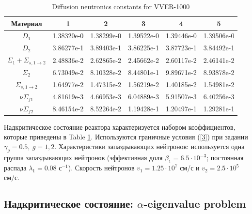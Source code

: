 \documentclass[authoryear]{elsarticle}
\begin{document}
\begin{table}[htr]
\caption{Diffusion neutronics constants for VVER-1000}
\label{t-1}
\begin{center}
\begin{tabular}{|c|c|c|c|c|c|}
\hline
Материал & 1 & 2 & 3 & 4 & 5\\
\hline
$D_1$ & 1.38320e-0 & 1.38299e-0  & 1.39522e-0  & 1.39446e-0  & 1.39506e-0 \\
$D_2$ & 3.86277e-1 & 3.89403e-1 & 3.86225e-1 & 3.87723e-1 & 3.84492e-1 \\
$\Sigma_1 + \Sigma_{s,1\rightarrow 2}$ & 2.48836e-2 & 2.62865e-2 & 2.45662e-2 & 2.60117e-2 & 2.46141e-2\\
$\Sigma_2$ & 6.73049e-2 & 8.10328e-2 & 8.44801e-1 & 9.89671e-2 & 8.93878e-2\\
$\Sigma_{s,1\rightarrow 2}$ & 1.64977e-2 & 1.47315e-2 & 1.56219e-2 & 1.40185e-2 & 1.54981e-2\\
$\nu\Sigma_{f1}$ & 4.81619e-3 & 4.66953e-3 & 6.04889e-3 & 5.91507e-3 & 6.40256e-3\\
$\nu\Sigma_{f2}$ & 8.46154e-2 & 8.52264e-2 & 1.19428e-1 & 1.20497e-1 & 1.29281e-1\\
\hline
\end{tabular}
\end{center}
\end{table}

Надкритическое состояние реактора характеризуется набором коэффициентов, которые приведены в Table \ref{t-1}. 
Используются граничные условия (\ref{3}) при задании $\gamma_g = 0.5, \ g = 1,2$.  
Характеристики запаздывающих нейтронов: используется одна группа запаздывающих нейтронов 
(эффективная доля $\beta_1 = 6.5\cdot10^{-3}$; постоянная распада $\lambda_1 = 0.08$ с$^{-1}$). 
Скорость нейтронов  $v_1 = 1.25 \cdot 10^7$ см/с и  $v_2 = 2.5 \cdot 10^5$ см/с.

\subsection{Надкритическое состояние: $\alpha$-eigenvalue problem} 
\end{document}
